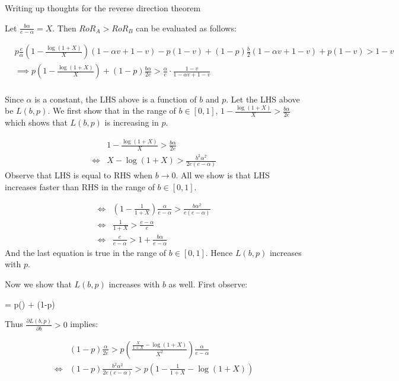 {\arpit Writing up thoughts for the reverse direction theorem

Let $\frac{b\alpha}{e-\alpha} = X$. Then $RoR_A > RoR_B$ can be evaluated as follows:

\begin{align*}
& p\frac{e}{\alpha}\left(1-\frac{\log(1+X)}{X}\right)(1-\alpha v + 1 - v) - p(1-v) + (1-p)\frac{b}{2}\left(1-\alpha v + 1-v\right) + p(1-v) > 1-v\\
& \implies p\left(1 - \frac{\log(1+X)}{X}\right) + (1-p)\frac{b\alpha}{2e} > \frac{\alpha}{e} \cdot \frac{1-v}{1-\alpha v + 1 - v}\\
\end{align*}

Since $\alpha$ is a constant, the LHS above is a function of $b$ and $p$. 
Let the LHS above be $L(b,p)$.
We first show that in the range of $b\in [0,1]$, $1 - \frac{\log(1+X)}{X} > \frac{b\alpha}{2e}$ which shows that $L(b,p)$ is increasing in $p$.

\begin{align*}
& 1-\frac{\log(1+X)}{X} > \frac{b\alpha}{2e}\\
\Leftrightarrow & X - \log(1+X) > \frac{b^2\alpha^2}{2e(e-\alpha)}
\end{align*}
Observe that LHS is equal to RHS when $b\rightarrow 0$. 
All we show is that LHS increases faster than RHS in the range of $b\in [0,1]$. 

\begin{align*}
\Leftrightarrow & \left(1 - \frac{1}{1+X}\right) \frac{\alpha}{e-\alpha} > \frac{b\alpha^2}{e(e-\alpha)}\\
\Leftrightarrow & \frac{1}{1+X} > \frac{e-\alpha}{e}\\
\Leftrightarrow & \frac{e}{e-\alpha} > 1 + \frac{b\alpha}{e-\alpha}
\end{align*}
And the last equation is true in the range of $b\in [0,1]$. Hence $L(b,p)$ increases with $p$.

Now we show that $L(b,p)$ increases with $b$ as well. First observe:

\beq
{} = p\left(\right) + (1-p)
\notag
\eeq

Thus $\frac{\partial L(b,p)}{\partial b} > 0$ implies:

\begin{align*}
& (1-p)\frac{\alpha}{2e} > p\left(\frac{\frac{X}{1+X} - \log(1+X)}{X^2}\right)\frac{\alpha}{e-\alpha}\\
\Leftrightarrow & (1-p)\frac{b^2\alpha^2}{2e(e-\alpha)} > p \left(1 - \frac{1}{1+X} - \log(1+X)\right)
\end{align*}

}
